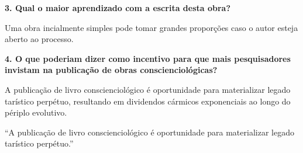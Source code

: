 \documentclass{gescons}
\begin{document}
\begin{multicols}{2}
\textbf{3. Qual o maior aprendizado com a escrita desta obra?}

Uma obra incialmente simples pode tomar grandes proporções caso o autor esteja aberto ao processo. 

\textbf{4. O que poderiam dizer como incentivo para que mais pesquisadores invistam na publicação de obras conscienciológicas?}

A publicação de livro conscienciológico é oportunidade para materializar legado tarístico perpétuo, resultando em dividendos cármicos exponenciais ao longo do périplo evolutivo.

\begin{pullquote}
    ``A publicação de livro conscienciológico é oportunidade para materializar legado tarístico perpétuo.''
\end{pullquote}


    
    \end{multicols}
\end{document}
